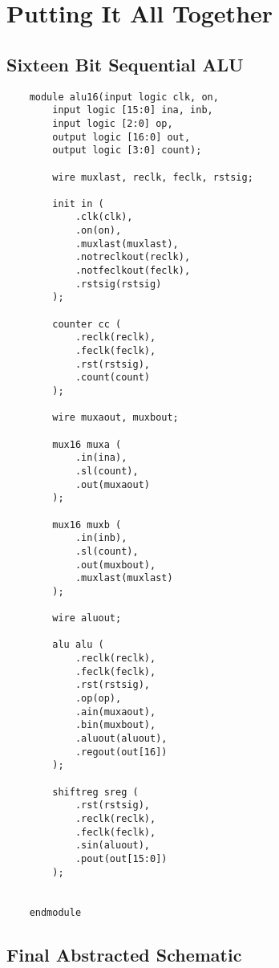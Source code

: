 \documentclass[../main] {subfiles}
\begin{document}
\section{Putting It All Together}

\subsection {Sixteen Bit Sequential ALU}

\begin{verbatim}
    module alu16(input logic clk, on,
        input logic [15:0] ina, inb,
        input logic [2:0] op,
        output logic [16:0] out,
        output logic [3:0] count);

        wire muxlast, reclk, feclk, rstsig;

        init in (
            .clk(clk),
            .on(on),
            .muxlast(muxlast),
            .notreclkout(reclk),
            .notfeclkout(feclk),
            .rstsig(rstsig)
        );

        counter cc (
            .reclk(reclk),
            .feclk(feclk),
            .rst(rstsig),
            .count(count)
        );

        wire muxaout, muxbout;

        mux16 muxa (
            .in(ina),
            .sl(count),
            .out(muxaout)
        );

        mux16 muxb (
            .in(inb),
            .sl(count),
            .out(muxbout),
            .muxlast(muxlast)
        );

        wire aluout;

        alu alu (
            .reclk(reclk),
            .feclk(feclk),
            .rst(rstsig),
            .op(op),
            .ain(muxaout),
            .bin(muxbout),
            .aluout(aluout),
            .regout(out[16])
        );

        shiftreg sreg (
            .rst(rstsig),
            .reclk(reclk),
            .feclk(feclk),
            .sin(aluout),
            .pout(out[15:0])
        );


    endmodule
\end{verbatim}

\clearpage

\subsection{Final Abstracted Schematic}
\end{document}
